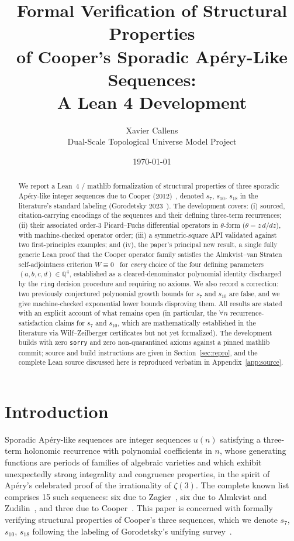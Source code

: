 \documentclass[11pt]{article}
\title{Formal Verification of Structural Properties\\
of Cooper's Sporadic Ap\'ery-Like Sequences:\\
A Lean 4 Development}
\author{Xavier Callens \\ \small{Dual-Scale Topological Universe Model Project}}
\date{\today}
\begin{document}
\maketitle

\begin{abstract}
We report a Lean~4 / mathlib formalization of structural properties of three
sporadic Ap\'ery-like integer sequences due to Cooper (2012)~\cite{Cooper2012},
denoted $s_7$, $s_{10}$, $s_{18}$ in the literature's standard labeling
(Gorodetsky 2023~\cite{Gorodetsky2023}). The development covers: (i) sourced,
citation-carrying encodings of the sequences and their defining three-term
recurrences; (ii) their associated order-3 Picard--Fuchs differential operators
in $\theta$-form ($\theta = z\,d/dz$), with machine-checked operator order;
(iii) a symmetric-square API validated against two first-principles examples;
and (iv), the paper's principal new result, a single fully generic Lean proof
that the Cooper operator family satisfies the Almkvist--van Straten
self-adjointness criterion $W \equiv 0$~\cite{AlmkvistvanStraten2021} for
\emph{every} choice of the four defining parameters $(a,b,c,d) \in \mathbb{Q}^4$,
established as a cleared-denominator polynomial identity discharged by the
\texttt{ring} decision procedure and requiring no axioms. We also record a
correction: two previously conjectured polynomial growth bounds for $s_7$ and
$s_{10}$ are false, and we give machine-checked exponential lower bounds
disproving them. All results are stated with an explicit account of what
remains open (in particular, the $\forall n$ recurrence-satisfaction claims for
$s_7$ and $s_{10}$, which are mathematically established in the literature via
Wilf--Zeilberger certificates but not yet formalized). The development builds
with zero \texttt{sorry} and zero non-quarantined axioms against a pinned
mathlib commit; source and build instructions are given in
Section~\ref{sec:repro}, and the complete Lean source discussed here is
reproduced verbatim in Appendix~\ref{app:source}.
\end{abstract}

\tableofcontents

\section{Introduction}

Sporadic Ap\'ery-like sequences are integer sequences $u(n)$ satisfying a
three-term holonomic recurrence with polynomial coefficients in $n$, whose
generating functions are periods of families of algebraic varieties and which
exhibit unexpectedly strong integrality and congruence properties, in the
spirit of Ap\'ery's celebrated proof of the irrationality of $\zeta(3)$. The
complete known list comprises 15 such sequences: six due to
Zagier~\cite{Zagier2009}, six due to Almkvist and
Zudilin~\cite{AlmkvistvanStraten2021}, and three due to
Cooper~\cite{Cooper2012}. This paper is concerned with formally verifying
structural properties of Cooper's three sequences, which we denote $s_7$,
$s_{10}$, $s_{18}$ following the labeling of Gorodetsky's unifying
survey~\cite{Gorodetsky2023}.
\end{document}

